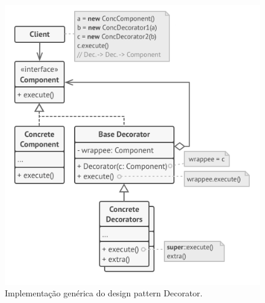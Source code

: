 \begin{figure}[H]
    \centering
    \includegraphics[scale=0.5]{images/decorator.png}
    \caption{Implementação genérica do design pattern Decorator.}
    \label{fig:decorator}
\end{figure}

